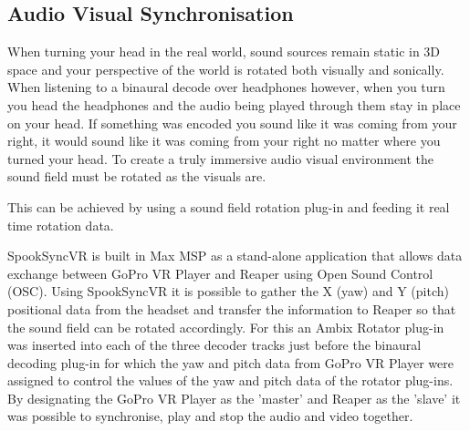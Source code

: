 		\subsection{Audio Visual Synchronisation}

			When turning your head in the real world, sound sources remain static in 3D space and your perspective of the world is rotated both visually and sonically. When listening to a binaural decode over headphones however, when you turn you head the headphones and the audio being played through them stay in place on your head. If something was encoded you sound like it was coming from your right, it would sound like it was coming from your right no matter where you turned your head. To create a truly immersive audio visual environment the sound field must be rotated as the visuals are. 

			This can be achieved by using a sound field rotation plug-in and feeding it real time rotation data. 

			SpookSyncVR \cite{SpookSync} is built in Max MSP as a stand-alone application that allows data exchange between GoPro VR Player and Reaper using Open Sound Control (OSC). Using SpookSyncVR it is possible to gather the X (yaw) and Y (pitch) positional data from the headset and transfer the information to Reaper so that the sound field can be rotated accordingly. For this an Ambix Rotator plug-in was inserted into each of the three decoder tracks just before the binaural decoding plug-in for which the yaw and pitch data from GoPro VR Player were assigned to control the values of the yaw and pitch data of the rotator plug-ins. By designating the GoPro VR Player as the 'master' and Reaper as the 'slave' it was possible to synchronise, play and stop the audio and video together. 
	
		
